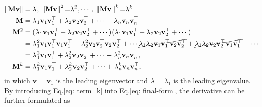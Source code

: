 \documentclass{article}
\newcommand{\bM}{\mathbf{M}}
\newcommand{\bv}{\mathbf{v}}
\begin{document}
	\begin{equation}
	\begin{aligned}
	\left\|\bM\bv\right\| & = \lambda, \; 
		\left\|\bM\bv\right\|^{2} {=} \lambda^{2}, \cdots, \; 
		\left\|\bM\bv\right\|^{k} {=} \lambda^{k} \\
	\bM &= \lambda_{1}\bv_{1}\bv_{1}^{\top} + \lambda_{2}\bv_{2}\bv_{2}^{\top} + \cdots +  \lambda_{n}\bv_{n}\bv_{n}^{\top}\\
	\bM^{2} &=  (\lambda_{1}\bv_{1}\bv_{1}^{\top} + \lambda_{2}\bv_{2}\bv_{2}^{\top} + \cdots)   (\lambda_{1}\bv_{1}\bv_{1}^{\top} + \lambda_{2}\bv_{2}\bv_{2}^{\top} + \cdots)\\
	 &= \lambda_{1}^{2}\bv_{1}\bv_{1}^{\top}\bv_{1}\bv_{1}^{\top} +  \lambda_{2}^{2}\bv_{2}\bv_{2}^{\top}\bv_{2}\bv_{2}^{\top} + \cdots
	\cancel{\lambda_{1}\lambda_{2}\bv_{1}\bv_{1}^{\top}\bv_{2}\bv_{2}^{\top}} + \cancel{\lambda_{1}\lambda_{2}\bv_{2}\bv_{2}^{\top}\bv_{1}\bv_{1}^{\top}} + \cdots\\
	 &= \lambda_{1}^{2}\bv_{1}\bv_{1}^{\top} +  \lambda_{2}^{2}\bv_{2}\bv_{2}^{\top} + \cdots + \lambda_{n}^{2}\bv_{n}\bv_{n}^{\top}, \\ 
	 \bM^{k} &= \lambda_{1}^{k}\bv_{1}\bv_{1}^{\top} +  \lambda_{2}^{k}\bv_{2}\bv_{2}^{\top} + \cdots + \lambda_{n}^{k}\bv_{n}\bv_{n}^{\top},\\
	\end{aligned}
	\label{eq: term_k}
	\end{equation}
	in which $\bv = \bv_1$ is the leading eigenvector and $\lambda=\lambda_1$ is the leading eigenvalue.
	By introducing Eq.\ref{eq: term_k} into Eq.\ref{eq: final-form}, the derivative can be further formulated as
	
\end{document}
